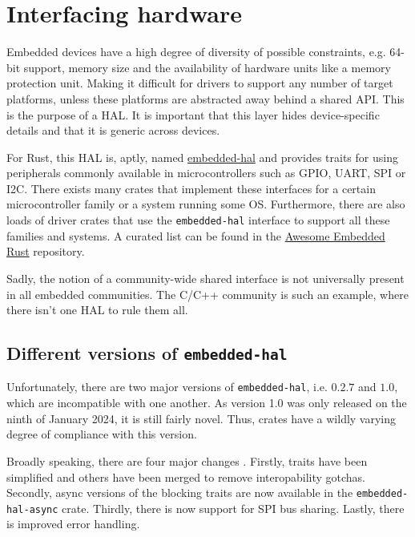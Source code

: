 \section{Interfacing hardware}
\label{chap:hardware}

Embedded devices have a high degree of diversity of possible constraints, e.g. 64-bit support, memory size and the availability of hardware units like a memory protection unit. Making it difficult for drivers to support any number of target platforms, unless these platforms are abstracted away behind a shared API. This is the purpose of a \gls{HAL}. It is important that this layer hides device-specific details and that it is generic across devices. 

For Rust, this \gls{HAL} is, aptly, named \href{https://github.com/rust-embedded/embedded-hal}{embedded-hal} and provides traits for using peripherals commonly available in microcontrollers such as \gls{GPIO}, \gls{UART}, \gls{SPI} or \gls{I2C}. There exists many crates that implement these interfaces for a certain microcontroller family or a system running some \gls{OS}. Furthermore, there are also loads of driver crates that use the \texttt{embedded-hal} interface to support all these families and systems. A curated list can be found in the \href{https://github.com/rust-embedded/awesome-embedded-rust}{Awesome Embedded Rust} repository.

Sadly, the notion of a community-wide shared interface is not universally present in all embedded communities. The C/C++ community is such an example, where there isn't one \gls{HAL} to rule them all.

\subsection{Different versions of \texttt{embedded-hal}}

Unfortunately, there are two major versions of \texttt{embedded-hal}, i.e. $0.2.7$ and $1.0$, which are incompatible with one another. 
As version 1.0 was only released on the ninth of January 2024, it is still fairly novel. Thus, crates have a wildly varying degree of compliance with this version. 

Broadly speaking, there are four major changes \cite{hal:1}. Firstly, traits have been simplified and others have been merged to remove interopability gotchas. 
Secondly, async versions of the blocking traits are now available in the \texttt{embedded-hal-async} crate. Thirdly, there is now support for \gls{SPI} bus sharing. Lastly, there is improved error handling.

